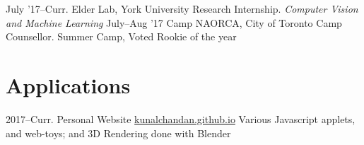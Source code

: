 \documentclass[]{chandan-cv}
\begin{document}
\begin{entrylist}
  \entry
    {July '17–Curr.}
    {Elder Lab, York University}
    {Research Internship.}
    {\emph{Computer Vision and Machine Learning}}
  \entry
    {July–Aug '17}
    {Camp NAORCA, City of Toronto}
    {Camp Counsellor.}
    {Summer Camp, Voted Rookie of the year}
\end{entrylist}

\section{Applications}

\begin{entrylist}
  \entry
    {2017–Curr.}
    {Personal Website}
    {\href{https://kunalchandan.github.io}{kunalchandan.github.io}}
    {Various Javascript applets, and web-toys; and 3D Rendering done with Blender}
\end{entrylist}
\end{document}
